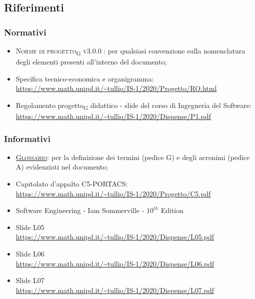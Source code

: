 \subsection{Riferimenti}



\subsubsection{Normativi}

\begin{itemize}
	\item \textsc{Norme di progetto\textsubscript{G} v3.0.0 }: per qualsiasi convenzione sulla nomenclatura degli elementi presenti all’interno del documento;
	\item Specifica tecnico-economica e organigramma: \\ {\url{https://www.math.unipd.it/~tullio/IS-1/2020/Progetto/RO.html}} %
	\item Regolamento progetto\textsubscript{G} didattico - slide del corso di Ingegneria del Software: \\ {\url{https://www.math.unipd.it/~tullio/IS-1/2020/Dispense/P1.pdf}}
\end{itemize}



\subsubsection{Informativi}
\begin{itemize}
	\item \textsc{\href{https://github.com/Three-Way-Milkshake/docs/wiki/Glossario}{Glossario}}: per la definizione dei termini (pedice G) e degli acronimi (pedice A) evidenziati nel documento;
	\item Capitolato d'appalto C5-PORTACS: \\
{\url{https://www.math.unipd.it/~tullio/IS-1/2020/Progetto/C5.pdf}}
	\item Software Engineering - Iam Sommerville - $10^{th}$ Edition
	\item Slide L05 \\
	{\url{https://www.math.unipd.it/~tullio/IS-1/2020/Dispense/L05.pdf}}%
	\item Slide L06 \\
	{\url{https://www.math.unipd.it/~tullio/IS-1/2020/Dispense/L06.pdf}}%
	\item Slide L07 \\
	{\url{https://www.math.unipd.it/~tullio/IS-1/2020/Dispense/L07.pdf}}%
\end{itemize}